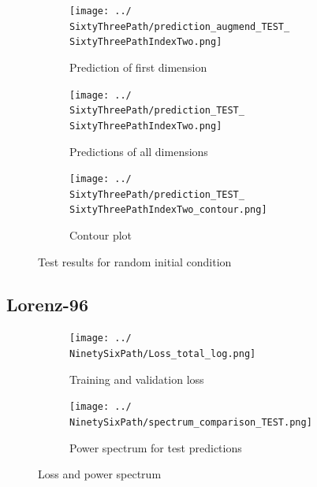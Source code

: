 	\begin{figure}[h]
		\centering
		\begin{subfigure}[b]{0.45\textwidth}
			\texttt{[image: ../\\SixtyThreePath/prediction\_augmend\_TEST\_\\SixtyThreePathIndexTwo.png]}
			\caption{Prediction of first dimension}
		\end{subfigure}
		\begin{subfigure}[b]{0.45\textwidth}
			\texttt{[image: ../\\SixtyThreePath/prediction\_TEST\_\\SixtyThreePathIndexTwo.png]}
			\caption{Predictions of all dimensions}
		\end{subfigure}
		\begin{subfigure}[b]{\textwidth}
			\texttt{[image: ../\\SixtyThreePath/prediction\_TEST\_\\SixtyThreePathIndexTwo\_contour.png]}
			\caption{Contour plot}
		\end{subfigure}
		\caption{Test results for random initial condition \SixtyThreePathIndexTwo}
		\label{63:predictions2}
	\end{figure}

	\FloatBarrier
\subsection{Lorenz-96}
	\newcommand{\NinetySixPath}{Results/Lorenz-96/Figures/RNN-lstm-RDIM_10-N_used_100000-NUM-LAY_3-SIZE-LAY_100-ACT_tanh-ISH_statefull-SL_8-PL_2-LR_0.0001-DKP_1.0-ZKP_1.0-HSPL_300-IPL_200-NL_1-WID_0}
	\newcommand{\NinetySixPathIndexOne}{25172}
	\newcommand{\NinetySixPathIndexTwo}{50168}
	
	\begin{figure}[h]
		\centering
		\begin{subfigure}[b]{0.45\textwidth}
			\texttt{[image: ../\\NinetySixPath/Loss\_total\_log.png]}
			\caption{Training and validation loss}
			\label{96:loss}
		\end{subfigure}
		\begin{subfigure}[b]{0.45\textwidth}
			\texttt{[image: ../\\NinetySixPath/spectrum\_comparison\_TEST.png]}
			\caption{Power spectrum for test predictions}
			\label{96:spectrum}
		\end{subfigure}
		\caption{Loss and power spectrum}
	\end{figure}

